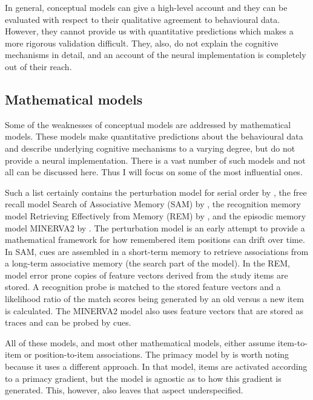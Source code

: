 In general, conceptual models can give a high-level account and they can be evaluated with respect to their qualitative agreement to behavioural data.
However, they cannot provide us with quantitative predictions which makes a more rigorous validation difficult.
They, also, do not explain the cognitive mechanisms in detail, and an account of the neural implementation is completely out of their reach.


\subsection{Mathematical models}
Some of the weaknesses of conceptual models are addressed by mathematical models.
These models make quantitative predictions about the behavioural data and describe underlying cognitive mechanisms to a varying degree, but do not provide a neural implementation.
There is a vast number of such models and not all can be discussed here.
Thus I will focus on some of the most influential ones.

Such a list certainly contains the perturbation model for serial order by \textcite{Estes1972}, the free recall model Search of Associative Memory (SAM) by \textcite{Raaijmakers1981}, the recognition memory model Retrieving Effectively from Memory (REM) by \textcite{Shiffrin1997}, and the episodic memory model MINERVA2 by \textcite{Hintzman1988}.
The perturbation model is an early attempt to provide a mathematical framework for how remembered item positions can drift over time.
In SAM, cues are assembled in a short-term memory to retrieve associations from a long-term associative memory (the search part of the model).
In the REM, model error prone copies of feature vectors derived from the study items are stored.
A recognition probe is matched to the stored feature vectors and a likelihood ratio of the match scores being generated by an old versus a new item is calculated.
The MINERVA2 model also uses feature vectors that are stored as traces and can be probed by cues.

All of these models, and most other mathematical models, either assume item-to-item or position-to-item associations.
The primacy model by \textcite{Page1998} is worth noting because it uses a different approach.
In that model, items are activated according to a primacy gradient, but the model is agnostic as to how this gradient is generated.
This, however, also leaves that aspect underspecified.

